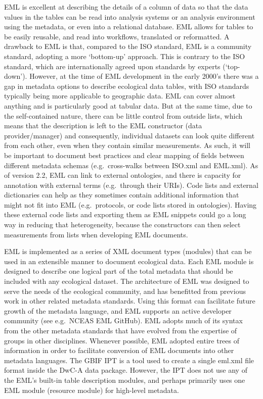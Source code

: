 \documentclass[
]{book}
\begin{document}
EML is excellent at describing the details of a column of data so that the data values in the tables can be read into analysis systems or an analysis environment using the metadata, or even into a relational database. EML allows for tables to be easily reusable, and read into workflows, translated or reformatted. A drawback to EML is that, compared to the ISO standard, EML is a community standard, adopting a more `bottom-up' approach. This is contrary to the ISO standard, which are internationally agreed upon standards by experts (`top-down'). However, at the time of EML development in the early 2000's there was a gap in metadata options to describe ecological data tables, with ISO standards typically being more applicable to geographic data. EML can cover almost anything and is particularly good at tabular data. But at the same time, due to the self-contained nature, there can be little control from outside lists, which means that the description is left to the EML constructor (data provider/manager) and consequently, individual datasets can look quite different from each other, even when they contain similar measurements. As such, it will be important to document best practices and clear mapping of fields between different metadata schemas (e.g.~cross-walks between ISO.xml and EML.xml). As of version 2.2, EML can link to external ontologies, and there is capacity for annotation with external terms (e.g.~through their URIs). Code lists and external dictionaries can help as they sometimes contain additional information that might not fit into EML (e.g.~protocols, or code lists stored in ontologies). Having these external code lists and exporting them as EML snippets could go a long way in reducing that heterogeneity, because the constructors can then select measurements from lists when developing EML documents.

EML is implemented as a series of XML document types (modules) that can be used in an extensible manner to document ecological data. Each EML module is designed to describe one logical part of the total metadata that should be included with any ecological dataset. The architecture of EML was designed to serve the needs of the ecological community, and has benefitted from previous work in other related metadata standards. Using this format can facilitate future growth of the metadata language, and EML supports an active developer community (see e.g.~NCEAS EML GitHub). EML adopts much of its syntax from the other metadata standards that have evolved from the expertise of groups in other disciplines. Whenever possible, EML adopted entire trees of information in order to facilitate conversion of EML documents into other metadata languages. The GBIF IPT is a tool used to create a single eml.xml file format inside the DwC-A data package. However, the IPT does not use any of the EML's built-in table description modules, and perhaps primarily uses one EML module (resource module) for high-level metadata.
\end{document}
